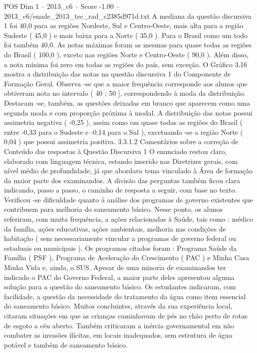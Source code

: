 \begin{textsample}{POS Dim 1 – 2013\_c6 – Score -1.00 – 2013\_c6/enade\_2013\_tec\_rad\_c2385d971d.txt}
A mediana da questão discursiva 1 foi 40,0 para as regiões Nordeste, Sul e Centro-Oeste, mais alta para a região Sudeste ( 45,0 ) e mais baixa para a Norte ( 35,0 ).
Para o Brasil como um todo foi também 40,0.
As notas máximas foram as mesmas para quase todas as regiões do Brasil ( 100,0 ), exceto nas regiões Norte e Centro-Oeste ( 90,0 ).
Além disso, a nota mínima foi zero em todas as regiões do país, sem exceção.
O Gráfico 3.16 mostra a distribuição das notas na questão discursiva 1 do Componente de Formação Geral.
Observa -se que a maior frequência corresponde aos alunos que obtiveram nota no intervalo ( 40 ; 50 ], correspondendo à moda da distribuição.
Destacam -se, também, as questões deixadas em branco que aparecem como uma segunda moda e com proporção próxima à modal.
A distribuição das notas possui assimetria negativa ( -0,25 ), assim como em quase todas as regiões do Brasil ( entre -0,33 para o Sudeste e -0,14 para o Sul ), excetuando -se a região Norte ( 0,04 ) que possui assimetria positiva. 3.3.1.2 Comentários sobre a correção de Conteúdo das respostas à Questão Discursiva 1 O enunciado restou claro, elaborado com linguagem técnica, estando inserido nas Diretrizes gerais, com nível médio de profundidade, já que abordava tema vinculado à Área de formação da maior parte dos examinandos.
A divisão das perguntas também ficou clara indicando, passo a passo, o caminho de resposta a seguir, com base no texto.
Verificou -se dificuldade quanto à análise dos programas de governo existentes que contribuem para melhoria do saneamento básico.
Nesse ponto, os alunos referiram, com muita frequência, a ações relacionadas à Saúde, tais como : médico da família, ações educativas, ações ambientais, melhoria nas condições de habitação ( sem necessariamente vincular a programas de governo federal ou estaduais ou municipais ).
Os programas citados foram : Programa Saúde da Família ( PSF ), Programa de Aceleração do Crescimento ( PAC ) e Minha Casa Minha Vida e, ainda, o SUS.
Apesar de uma minoria de examinandos ter indicado o PAC do Governo Federal, a maior parte deles apresentou alguma solução para a questão do saneamento básico.
Os estudantes indicaram, com facilidade, a questão da necessidade do tratamento da água como item essencial do saneamento básico.
Muitos concluintes, através da sua experiência local, citaram situações em que as crianças caminhavam de pés no chão perto de rotas de esgoto a céu aberto.
Também criticaram a inércia governamental em não combater as invasões ilícitas, em locais inadequados, sem estrutura de água potável e também de saneamento básico.

\end{textsample}
